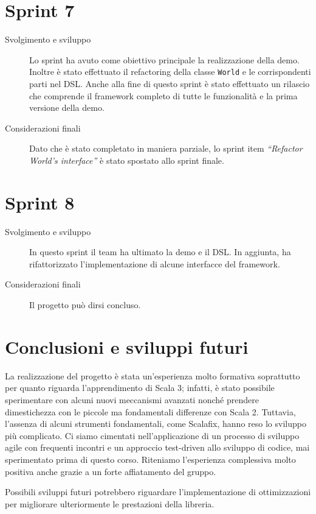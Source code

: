 \section{Sprint 7}\label{sec:sprint-7}
\begin{description}
    \item[Svolgimento e sviluppo] Lo sprint ha avuto come obiettivo principale la realizzazione della demo.
    Inoltre è stato effettuato il refactoring della classe \texttt{World} e le corrispondenti parti nel DSL\@.
    Anche alla fine di questo sprint è stato effettuato un rilascio che comprende il framework completo di tutte le
    funzionalità e la prima versione della demo.
    \item[Considerazioni finali] Dato che è stato completato in maniera parziale, lo sprint item
    \textit{``Refactor World's interface''} è stato spostato allo sprint finale.
\end{description}
\section{Sprint 8}\label{sec:sprint-8}
\begin{description}
    \item[Svolgimento e sviluppo] In questo sprint il team ha ultimato la demo e il DSL. In aggiunta, ha rifattorizzato
    l'implementazione di alcune interfacce del framework.
    \item[Considerazioni finali] Il progetto può dirsi concluso.
\end{description}

\section{Conclusioni e sviluppi futuri}\label{sec:conclusioni-e-sviluppi-futuri}
La realizzazione del progetto è stata un'esperienza molto formativa soprattutto per quanto riguarda l'apprendimento di Scala 3;
infatti, è stato possibile sperimentare con alcuni nuovi meccanismi avanzati nonché prendere dimestichezza con le
piccole ma fondamentali differenze con Scala 2.
Tuttavia, l'assenza di alcuni strumenti fondamentali, come Scalafix, hanno reso lo sviluppo più complicato.
Ci siamo cimentati nell'applicazione di un processo di sviluppo agile con frequenti incontri e un approccio
test-driven allo sviluppo di codice, mai sperimentato prima di questo corso.
Riteniamo l'esperienza complessiva molto positiva anche grazie a un forte affiatamento del gruppo.

Possibili sviluppi futuri potrebbero riguardare l'implementazione di ottimizzazioni per migliorare ulteriormente
le prestazioni della libreria.
